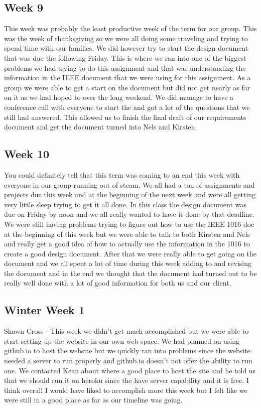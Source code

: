 \documentclass[10pt,draftclsnofoot,onecolumn]{IEEEtran}
\begin{document}
\subsection{Week 9}
This week was probably the least productive week of the term for our group. This was the week of thanksgiving so we were all doing some traveling and trying to spend time with our families. We did however try to start the design document that was due the following Friday. This is where we ran into one of the biggest problems we had trying to do this assignment and that was understanding the information in the IEEE document that we were using for this assignment. As a group we were able to get a start on the document but did not get nearly as far on it as we had hoped to over the long weekend. We did manage to have a conference call with everyone to start the and got a lot of the questions that we still had answered. This allowed us to finish the final draft of our requirements document and get the document turned into Nels and Kirsten.  

\subsection{Week 10}
You could definitely tell that this term was coming to an end this week with everyone in our group running out of steam. We all had a ton of assignments and projects due this week and at the beginning of the next week and were all getting very little sleep trying to get it all done. In this class the design document was due on Friday by noon and we all really wanted to have it done by that deadline. We were still having problems trying to figure out how to use the IEEE 1016 doc at the beginning  of this week but we were able to talk to both Kirsten and Nels and really get a good idea of how to actually use the information in the 1016 to create a good design document. After that we were really able to get going on the document and we all spent a lot of time during this week adding to and revising the document and in the end we thought that the document had turned out to be really well done with a lot of good information for both us and our client. 

\subsection{Winter Week 1}
Shawn Cross - This week we didn't get much accomplished but we were able to start setting up the website in our own web space. We had planned on using github.io to host the website but we quickly ran into problems since the website needed a server to run properly and github.io doesn't not offer the ability to run one. We contacted Kean about where a good place to host the site and he told us that we should run it on heroku since the have server capability and it is free. I think overall I would have liked to accomplish more this week but I felt like we were still in a good place as far as our timeline was going.
\end{document}
